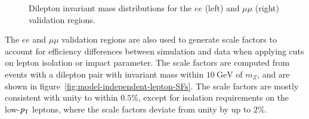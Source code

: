 \begin{figure}[htbp]
  \caption{Dilepton invariant mass distributions for the $ee$ (left) and $\mu\mu$ (right) validation regions.}
  \label{fig:model-independent-VR-dilepton}
\end{figure}

The $ee$ and $\mu\mu$ validation regions are also used to generate scale factors to account for efficiency
differences between simulation and data when applying cuts on lepton isolation or impact parameter. The scale factors are computed from events with a dilepton pair with invariant mass within $\SI{10}{\giga\electronvolt}$ of $m_Z$, and are shown in figure~\ref{fig:model-independent-lepton-SFs}. The scale factors are mostly consistent with unity to within $0.5\%$, except for isolation requirements on the low-$p_{\text{T}}$ leptons, where the scale factors deviate from unity by up to $2\%$. 

